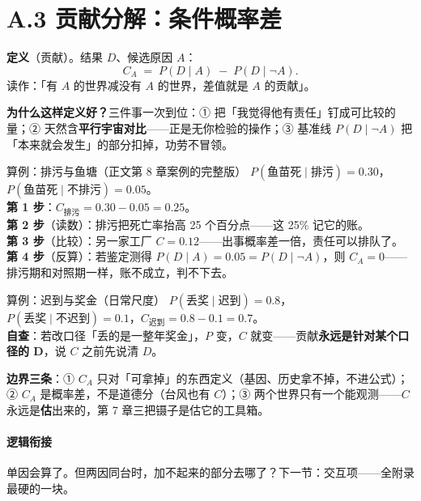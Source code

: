 \documentclass[../../main2.tex]{subfiles}
\begin{document}
\section{A.3 贡献分解：条件概率差}
\label{app:contrib}


\begin{definitionbox}
	\textbf{定义}（贡献）。结果 $D$、候选原因 $A$：
	\[
	C_A \;=\; P(D \mid A) \;-\; P(D \mid \neg A).
	\]
	读作：「有 $A$ 的世界减没有 $A$ 的世界，差值就是 $A$ 的贡献」。
\end{definitionbox}

\textbf{为什么这样定义好？}三件事一次到位：① 把「我觉得他有责任」钉成可比较的量；② 天然含\textbf{平行宇宙对比}——正是无你检验的操作；③ 基准线 $P(D \mid \neg A)$ 把「本来就会发生」的部分扣掉，功劳不冒领。

\begin{mathbox}{算例：排污与鱼塘（正文第 8 章案例的完整版）}
	$P(\text{鱼苗死} \mid \text{排污}) = 0.30$，$P(\text{鱼苗死} \mid \text{不排污}) = 0.05$。\\
	\textbf{第 1 步}：$C_{\text{排污}} = 0.30 - 0.05 = 0.25$。\\
	\textbf{第 2 步}（读数）：排污把死亡率抬高 25 个百分点——这 25\% 记它的账。\\
	\textbf{第 3 步}（比较）：另一家工厂 $C = 0.12$——出事概率差一倍，责任可以排队了。\\
	\textbf{第 4 步}（反算）：若鉴定测得 $P(D \mid A) = 0.05 = P(D \mid \neg A)$，则 $C_A = 0$——排污期和对照期一样，账不成立，判不下去。
\end{mathbox}

\begin{mathbox}{算例：迟到与奖金（日常尺度）}
	$P(\text{丢奖} \mid \text{迟到}) = 0.8$，$P(\text{丢奖} \mid \text{不迟到}) = 0.1$，$C_{\text{迟到}} = 0.8 - 0.1 = 0.7$。\\
	\textbf{自查}：若改口径「丢的是一整年奖金」，$P$ 变，$C$ 就变——贡献\textbf{永远是针对某个口径的 D}，说 $C$ 之前先说清 $D$。
\end{mathbox}

\textbf{边界三条}：① $C_A$ 只对「可拿掉」的东西定义（基因、历史拿不掉，不进公式）；② $C_A$ 是概率差，不是道德分（台风也有 $C$）；③ 两个世界只有一个能观测——$C$ 永远是\textbf{估}出来的，第 7 章三把镊子是估它的工具箱。

\paragraph*{逻辑衔接}
	单因会算了。但两因同台时，加不起来的部分去哪了？下一节：交互项——全附录最硬的一块。
\end{document}
